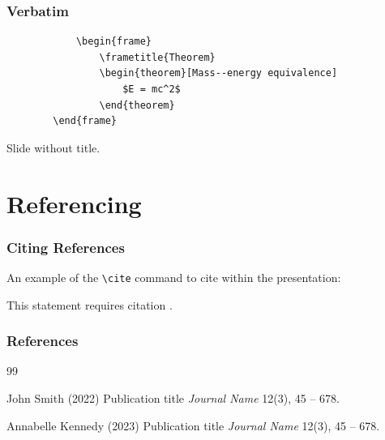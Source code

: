 \documentclass[
	11pt, %
]{beamer}
\begin{document}
\begin{frame}[fragile] %
	\frametitle{Verbatim}
	
	\begin{example}
		\begin{verbatim}
			\begin{frame}
				\frametitle{Theorem}
				\begin{theorem}[Mass--energy equivalence]
					$E = mc^2$
				\end{theorem}
		\end{frame}\end{verbatim} %
	\end{example}
\end{frame}


\begin{frame}
	Slide without title.
\end{frame}


\section{Referencing}

\begin{frame}
	\frametitle{Citing References}
	
	An example of the \texttt{\textbackslash cite} command to cite within the presentation:
	
	\bigskip %
	
	This statement requires citation \cite{p1,p2}.
\end{frame}


\begin{frame} %
	\frametitle{References}
	
	\begin{thebibliography}{99} %
		\footnotesize %
		
			John Smith (2022)
			\newblock Publication title
			\newblock \emph{Journal Name} 12(3), 45 -- 678.
			
			Annabelle Kennedy (2023)
			\newblock Publication title
			\newblock \emph{Journal Name} 12(3), 45 -- 678.
	\end{thebibliography}
\end{frame}
\end{document}
